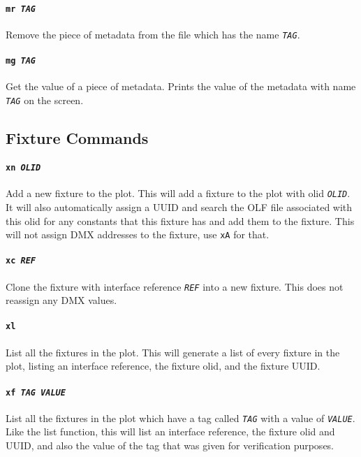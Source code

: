 \documentclass[a4paper]{article}
\begin{document}
\paragraph{\texttt{mr \textit{TAG}}}
Remove the piece of metadata from the file which has the name 
\texttt{\textit{TAG}}.

\paragraph{\texttt{mg \textit{TAG}}}
Get the value of a piece of metadata. Prints the value of the metadata with
name \texttt{\textit{TAG}} on the screen.

\subsection{Fixture Commands}

\paragraph{\texttt{xn \textit{OLID}}}
Add a new fixture to the plot. This will add a fixture to the plot with olid 
\texttt{\textit{OLID}}. It will also automatically assign a UUID and search 
the OLF file associated with this olid for any constants that this fixture has and add them to the fixture. This will not assign DMX addresses to the fixture,
use \texttt{xA} for that.

\paragraph{\texttt{xc \textit{REF}}}
Clone the fixture with interface reference \texttt{\textit{REF}} into a new 
fixture. This does not reassign any DMX values.

\paragraph{\texttt{xl}}
List all the fixtures in the plot. This will generate a list of every fixture 
in the plot, listing an interface reference, the fixture olid, and the fixture 
UUID.

\paragraph{\texttt{xf \textit{TAG VALUE}}}
List all the fixtures in the plot which have a tag called 
\texttt{\textit{TAG}} with a value of \texttt{\textit{VALUE}}. Like the list 
function, this will list an interface reference, the fixture olid and UUID, 
and also the value of the tag that was given for verification purposes.
\end{document}
